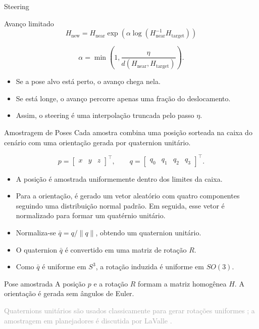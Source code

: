 \documentclass[aspectratio=169]{beamer}
\newcommand{\smalltag}[1]{\textcolor{darkgray}{\scriptsize #1}}
\begin{document}
\begin{frame}{Steering}
    \begin{block}{Avanço limitado}
        \[
        H_{\mathrm{new}}
        =
        H_{\mathrm{near}}
        \exp\left(
        \alpha
        \log(H_{\mathrm{near}}^{-1}H_{\mathrm{target}})
        \right)
        \]
    \end{block}

    \[
    \alpha =
    \min\left(
    1,
    \frac{\eta}{d(H_{\mathrm{near}},H_{\mathrm{target}})}
    \right).
    \]

    \begin{itemize}
        \item Se a pose alvo está perto, o avanço chega nela.
        \item Se está longe, o avanço percorre apenas uma fração do deslocamento.
        \item Assim, o steering é uma interpolação truncada pelo passo \(\eta\).
    \end{itemize}
\end{frame}

\begin{frame}{Amostragem de Poses}
    \footnotesize
    Cada amostra combina uma posição sorteada na caixa do cenário com uma
    orientação gerada por quaternion unitário.

    \[
    p =
    \begin{bmatrix}
    x & y & z
    \end{bmatrix}^{\top},
    \qquad
    q =
    \begin{bmatrix}
    q_0 & q_1 & q_2 & q_3
    \end{bmatrix}^{\top}.
    \]

    \begin{itemize}
        \item A posição é amostrada uniformemente dentro dos limites da caixa.
        \item Para a orientação, é gerado um vetor aleatório com quatro componentes seguindo uma distribuição normal padrão. Em seguida, esse vetor é normalizado para formar um quatérnio unitário.        \item Normaliza-se \(\bar{q}=q/\|q\|\), obtendo um quaternion unitário.
        \item O quaternion \(\bar{q}\) é convertido em uma matriz de rotação \(R\).
        \item Como \(\bar{q}\) é uniforme em \(S^3\), a rotação induzida é uniforme em \(SO(3)\).
    \end{itemize}

    \vspace{0.1cm}
    \begin{block}{Pose amostrada}
        A posição \(p\) e a rotação \(R\) formam a matriz homogênea \(H\).
        A orientação é gerada sem ângulos de Euler.
    \end{block}

    \smalltag{Quaternions unitários são usados classicamente para gerar rotações uniformes \cite{Shoemake1992}; a amostragem em planejadores é discutida por LaValle \cite{LaValle2006}.}
\end{frame}
\end{document}
